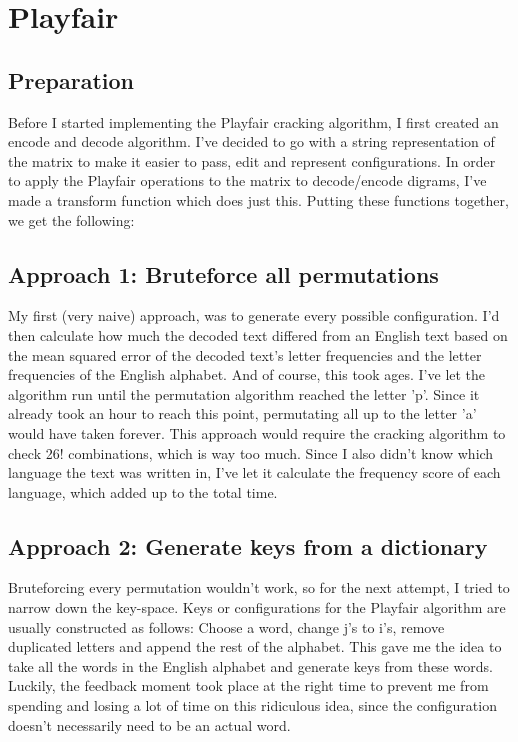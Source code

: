 \documentclass{article}
\begin{document}
\section{Playfair}

\subsection{Preparation}
Before I started implementing the Playfair cracking algorithm, I first created an encode and decode algorithm. I've decided to go with a string representation of the matrix to make it easier to pass, edit and represent configurations. In order to apply the Playfair operations to the matrix to decode/encode digrams, I've made a transform function which does just this. Putting these functions together, we get the following:

\subsection{Approach 1: Bruteforce all permutations}
My first (very naive) approach, was to generate every possible configuration. I'd then calculate how much the decoded text differed from an English text based on the mean squared error of the decoded text's letter frequencies and the letter frequencies of the English alphabet. And of course, this took ages. I've let the algorithm run until the permutation algorithm reached the letter 'p'. Since it already took an hour to reach this point, permutating all up to the letter 'a' would have taken forever. This approach would require the cracking algorithm to check 26! combinations, which is way too much. Since I also didn't know which language the text was written in, I've let it calculate the frequency score of each language, which added up to the total time.

\subsection{Approach 2: Generate keys from a dictionary}
Bruteforcing every permutation wouldn't work, so for the next attempt, I tried to narrow down the key-space. Keys or configurations for the Playfair algorithm are usually constructed as follows: Choose a word, change j's to i's, remove duplicated letters and append the rest of the alphabet. This gave me the idea to take all the words in the English alphabet and generate keys from these words. Luckily, the feedback moment took place at the right time to prevent me from spending and losing a lot of time on this ridiculous idea, since the configuration doesn't necessarily need to be an actual word.
\end{document}
